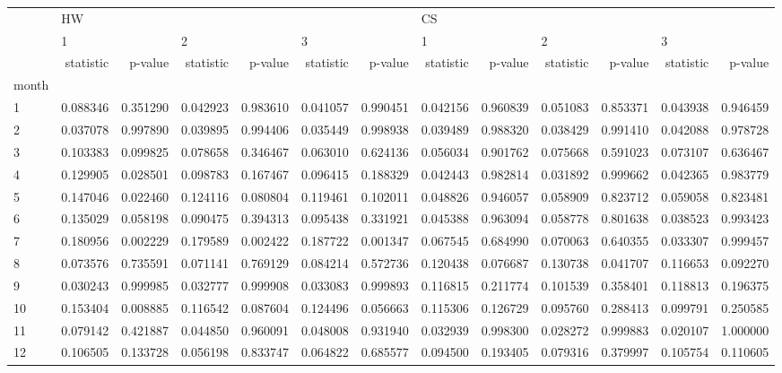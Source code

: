 \begin{tabular}{lrrrrrrrrrrrr}
\toprule
{} & \multicolumn{6}{l}{HW} & \multicolumn{6}{l}{CS} \\
{} & \multicolumn{2}{l}{1} & \multicolumn{2}{l}{2} & \multicolumn{2}{l}{3} & \multicolumn{2}{l}{1} & \multicolumn{2}{l}{2} & \multicolumn{2}{l}{3} \\
{} & statistic &   p-value & statistic &   p-value & statistic &   p-value & statistic &   p-value & statistic &   p-value & statistic &   p-value \\
month &           &           &           &           &           &           &           &           &           &           &           &           \\
\midrule
1     &  0.088346 &  0.351290 &  0.042923 &  0.983610 &  0.041057 &  0.990451 &  0.042156 &  0.960839 &  0.051083 &  0.853371 &  0.043938 &  0.946459 \\
2     &  0.037078 &  0.997890 &  0.039895 &  0.994406 &  0.035449 &  0.998938 &  0.039489 &  0.988320 &  0.038429 &  0.991410 &  0.042088 &  0.978728 \\
3     &  0.103383 &  0.099825 &  0.078658 &  0.346467 &  0.063010 &  0.624136 &  0.056034 &  0.901762 &  0.075668 &  0.591023 &  0.073107 &  0.636467 \\
4     &  0.129905 &  0.028501 &  0.098783 &  0.167467 &  0.096415 &  0.188329 &  0.042443 &  0.982814 &  0.031892 &  0.999662 &  0.042365 &  0.983779 \\
5     &  0.147046 &  0.022460 &  0.124116 &  0.080804 &  0.119461 &  0.102011 &  0.048826 &  0.946057 &  0.058909 &  0.823712 &  0.059058 &  0.823481 \\
6     &  0.135029 &  0.058198 &  0.090475 &  0.394313 &  0.095438 &  0.331921 &  0.045388 &  0.963094 &  0.058778 &  0.801638 &  0.038523 &  0.993423 \\
7     &  0.180956 &  0.002229 &  0.179589 &  0.002422 &  0.187722 &  0.001347 &  0.067545 &  0.684990 &  0.070063 &  0.640355 &  0.033307 &  0.999457 \\
8     &  0.073576 &  0.735591 &  0.071141 &  0.769129 &  0.084214 &  0.572736 &  0.120438 &  0.076687 &  0.130738 &  0.041707 &  0.116653 &  0.092270 \\
9     &  0.030243 &  0.999985 &  0.032777 &  0.999908 &  0.033083 &  0.999893 &  0.116815 &  0.211774 &  0.101539 &  0.358401 &  0.118813 &  0.196375 \\
10    &  0.153404 &  0.008885 &  0.116542 &  0.087604 &  0.124496 &  0.056663 &  0.115306 &  0.126729 &  0.095760 &  0.288413 &  0.099791 &  0.250585 \\
11    &  0.079142 &  0.421887 &  0.044850 &  0.960091 &  0.048008 &  0.931940 &  0.032939 &  0.998300 &  0.028272 &  0.999883 &  0.020107 &  1.000000 \\
12    &  0.106505 &  0.133728 &  0.056198 &  0.833747 &  0.064822 &  0.685577 &  0.094500 &  0.193405 &  0.079316 &  0.379997 &  0.105754 &  0.110605 \\
\bottomrule
\end{tabular}
